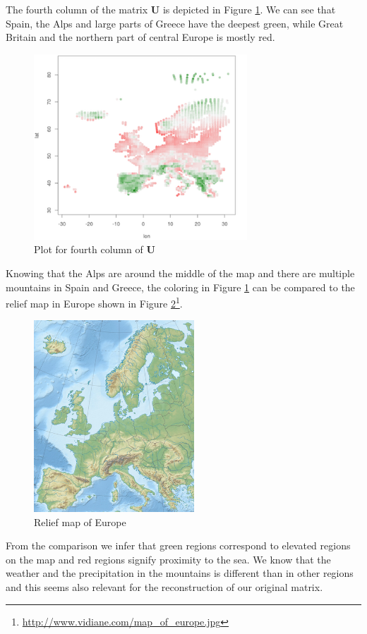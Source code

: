 \documentclass{support/acm_proc_article-sp}
\begin{document}
    The fourth column of the matrix $\mathbf{U}$ is depicted in Figure \ref{fig:2c-4}.
    We can see that Spain, the Alps and large parts of Greece have the deepest green, while Great Britain and the northern
    part of central Europe is mostly red.
    \begin{figure}[!htbp]
        \centering
        \includegraphics[width=8cm]{images/2c-4.png}
        \caption{Plot for fourth column of $\mathbf{U}$}
        \label{fig:2c-4}
    \end{figure}
    Knowing that the Alps are around the middle of the map and there are multiple mountains in Spain and Greece,
    the coloring in Figure \ref{fig:2c-4} can be compared to the relief
    map in Europe shown in Figure \ref{fig:relief-europe}\footnote{\href{http://www.vidiani.com/maps/maps\_of\_europe/detailed\_physical\_and\_relief\_map\_of\_europe.jpg}{http://www.vidiane.com/map\_of\_europe.jpg}}.
    \begin{figure}[!htbp]
        \centering
        \includegraphics[width=6cm]{images/relief-europe.png}
        \caption{Relief map of Europe}
        \label{fig:relief-europe}
    \end{figure}
    From the comparison we infer that green regions correspond to elevated regions on the map and red regions signify
    proximity to the sea.
    We know that the weather and the precipitation in the mountains is different than in other regions and this seems
    also relevant for the reconstruction of our original matrix.
\end{document}
